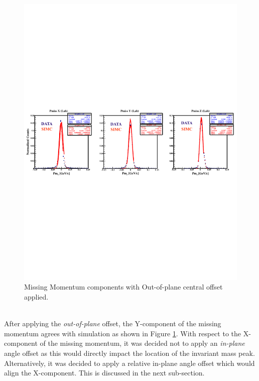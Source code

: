 \documentclass[11pt]{article}
\begin{document}
\begin{figure}[h!]
  \centering
  \includegraphics[scale=0.9]{plots/Oop_Pm_Offset.pdf}
  \caption{Missing Momentum components with Out-of-plane central offset applied.}
  \label{fig:PmComp_OopOffset}
\end{figure}\\

\noindent After applying the \textit{out-of-plane} offset, the Y-component of the missing momentum agrees with simulation as shown in Figure \ref{fig:PmComp_OopOffset}.
With respect to the X-component of the missing momentum, it was decided not to apply an \textit{in-plane} angle offset as
this would directly impact the location of the invariant mass peak. Alternatively, it was decided to apply a relative in-plane
angle offset which would align the X-component. This is discussed in the next sub-section.\\
\newpage
\end{document}
